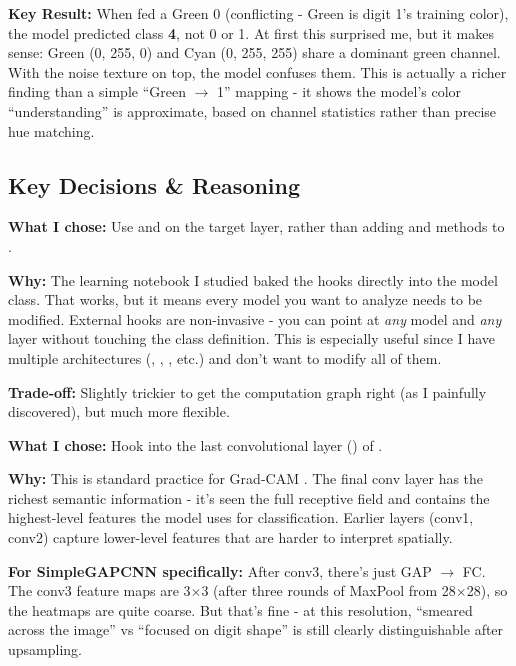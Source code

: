\documentclass[9pt,a4paper,twocolumn,twoside]{tau-class/tau}
\begin{document}
        \begin{note}
            \textbf{Key Result:} When fed a Green 0 (conflicting - Green is digit 1's training color), the model predicted class \textbf{4}, not 0 or 1. At first this surprised me, but it makes sense: Green (0, 255, 0) and Cyan (0, 255, 255) share a dominant green channel. With the noise texture on top, the model confuses them. This is actually a richer finding than a simple ``Green $\rightarrow$ 1'' mapping - it shows the model's color ``understanding'' is approximate, based on channel statistics rather than precise hue matching.
        \end{note}

    \subsection{Key Decisions \& Reasoning}

        \begin{tauenv}[frametitle=Decision: External Hooks Instead of Model Modification]
            \textbf{What I chose:} Use  and  on the target layer, rather than adding  and  methods to .

            \textbf{Why:} The learning notebook I studied baked the hooks directly into the model class. That works, but it means every model you want to analyze needs to be modified. External hooks are non-invasive - you can point  at \textit{any} model and \textit{any} layer without touching the class definition. This is especially useful since I have multiple architectures (, , , etc.) and don't want to modify all of them.

            \textbf{Trade-off:} Slightly trickier to get the computation graph right (as I painfully discovered), but much more flexible.
        \end{tauenv}

        \begin{tauenv}[frametitle={Decision: Target Layer = model.conv3 (Final Conv Layer)}]
            \textbf{What I chose:} Hook into the last convolutional layer () of .

            \textbf{Why:} This is standard practice for Grad-CAM \cite{gradcam}. The final conv layer has the richest semantic information - it's seen the full receptive field and contains the highest-level features the model uses for classification. Earlier layers (conv1, conv2) capture lower-level features that are harder to interpret spatially.

            \textbf{For SimpleGAPCNN specifically:} After conv3, there's just GAP $\rightarrow$ FC. The conv3 feature maps are 3$\times$3 (after three rounds of MaxPool from 28$\times$28), so the heatmaps are quite coarse. But that's fine - at this resolution, ``smeared across the image'' vs ``focused on digit shape'' is still clearly distinguishable after upsampling.
        \end{tauenv}
\end{document}
